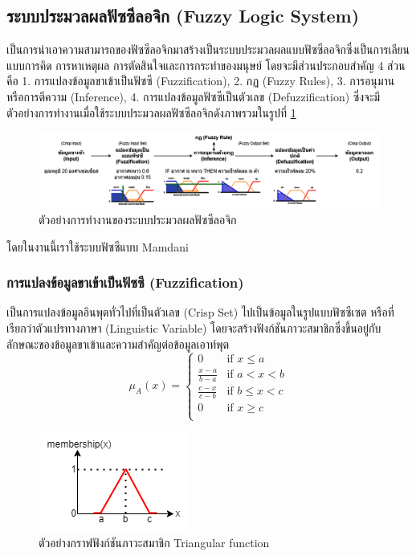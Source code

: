 \subsection{ระบบประมวลผลฟัซซีลอจิก (Fuzzy Logic System)}
เป็นการนำเอาความสามารถของฟัซซีลอจิกมาสร้างเป็นระบบประมวลผลแบบฟัซซีลอจิกซึ่งเป็นการเลียนแบบการคิด การหาเหตุผล การตัดสินใจและการกระทำของมนุษย์ โดยจะมีส่วนประกอบสำคัญ 4 ส่วนคือ 1. การแปลงข้อมูลขาเข้าเป็นฟัซซี (Fuzzification), 2. กฏ (Fuzzy Rules), 3. การอนุมานหรือการตีความ (Inference), 4. การแปลงข้อมูลฟัซซีเป็นตัวเลข (Defuzzification)
ซึ่งจะมีตัวอย่างการทำงานเมื่อใช้ระบบประมวลผลฟัซซีลอจิกดังภาพรวมในรูปที่ \ref{fig:2}
\begin{figure}[ht]
    \centering
    \includegraphics[scale=0.375]{images/ex_fis.png}
    \caption{ตัวอย่างการทำงานของระบบประมวลผลฟัซซีลอจิก}
    \label{fig:2}
\end{figure}

โดยในงานนี้เราใช้ระบบฟัซซีแบบ Mamdani

\subsubsection{การแปลงข้อมูลขาเข้าเป็นฟัซซี (Fuzzification)}
เป็นการแปลงข้อมูลอินพุตทั่วไปที่เป็นตัวเลข (Crisp Set) ไปเป็นข้อมูลในรูปแบบฟัซซีเซต หรือที่เรียกว่าตัวแปรทางภาษา (Linguistic Variable) โดยจะสร้างฟังก์ชันภาวะสมาชิกซึ่งขึ้นอยู่กับลักษณะของข้อมูลขาเข้าและความสำคัญต่อข้อมูลเอาท์พุต
\begin{equation} \mu_A(x) = \begin{cases}
0 & \text{if } x \leq a \\
\frac{x-a}{b-a} & \text{if } a < x < b \\
\frac{c-x}{c-b} & \text{if } b \leq x < c \\
0 & \text{if } x \geq c \\
\end{cases} \end{equation}
\begin{figure}[ht]
    \centering
    \includegraphics[scale=0.7]{images/ex_memship.png}
    \caption{ตัวอย่างกราฟฟังก์ชันภาวะสมาชิก Triangular function}
    \label{fig:3}
\end{figure}

